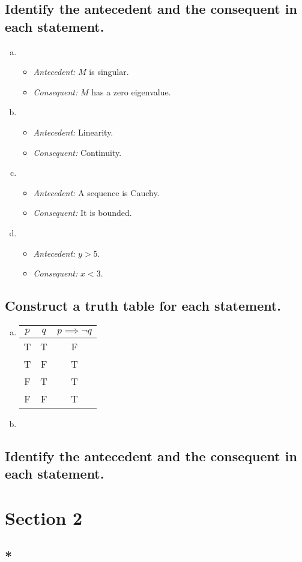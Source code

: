 \documentclass[12pt]{scrartcl} %
\begin{document}
\subsection{Identify the antecedent and the consequent in each statement.}
\begin{enumerate}[(a)]
	
	\item
	\begin{itemize}
		\item \emph{Antecedent:} $M$ is singular.
		\item \emph{Consequent:} $M$ has a zero eigenvalue.
	\end{itemize}
	
	\item
	\begin{itemize}
		\item \emph{Antecedent:} Linearity.
		\item \emph{Consequent:} Continuity.
	\end{itemize}
	
	\item
	\begin{itemize}
		\item \emph{Antecedent:} A sequence is Cauchy.
		\item \emph{Consequent:} It is bounded.
	\end{itemize}
	
	\item
	\begin{itemize}
		\item \emph{Antecedent:} $y > 5$.
		\item \emph{Consequent:} $x <3$.
	\end{itemize}
	\end{enumerate}

\subsection{Construct a truth table for each statement.}
\begin{enumerate}[(a)]
	\item 
		\begin{tabular}{*{2}{c}|*{1}{c}}$p$&$q$&$p \implies \neg q$\\
		\hline
		T&T&F\\
		T&F&T\\
		F&T&T\\
		F&F&T\\
		\end{tabular}
	\item
		
\end{enumerate}

\subsection{Identify the antecedent and the consequent in each statement.}

\section{Section 2}

\subsection{*}
\end{document}

